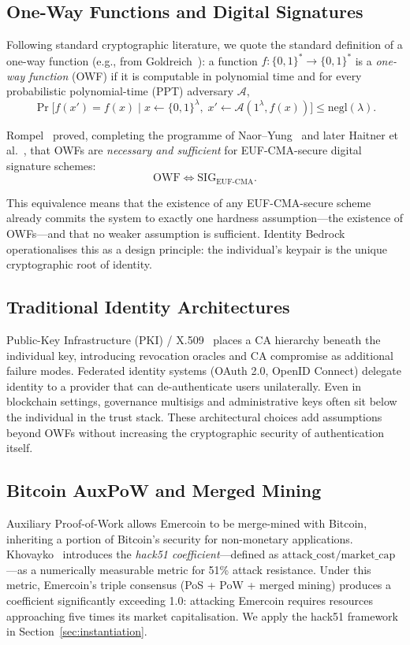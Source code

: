 \documentclass[11pt,a4paper]{article}
\begin{document}
\subsection{One-Way Functions and Digital Signatures}

Following standard cryptographic literature, we quote the standard definition of a one-way function (e.g., from Goldreich~\cite{goldreich2001}): a function $f : \{0,1\}^* \to \{0,1\}^*$ is a \emph{one-way function} (OWF)
if it is computable in polynomial time and for every probabilistic
polynomial-time (PPT) adversary $\mathcal{A}$,
\[
  \Pr\bigl[f(x') = f(x) \;\big|\; x \gets \{0,1\}^\lambda,\;
    x' \gets \mathcal{A}(1^\lambda, f(x))\bigr] \leq \mathrm{negl}(\lambda).
\]

Rompel~\cite{rompel1990} proved, completing the programme of
Naor--Yung~\cite{naoryung1989} and later Haitner et
al.~\cite{haitner2010}, that OWFs are \emph{necessary and sufficient} for
EUF-CMA-secure digital signature schemes:
\[
  \mathrm{OWF} \iff \mathrm{SIG}_{\mathrm{EUF\text{-}CMA}}.
\]

This equivalence means that the existence of any EUF-CMA-secure scheme
already commits the system to exactly one hardness assumption---the existence
of OWFs---and that no weaker assumption is sufficient.  Identity Bedrock
operationalises this as a design principle: the individual's keypair is the
unique cryptographic root of identity.

\subsection{Traditional Identity Architectures}

Public-Key Infrastructure (PKI) / X.509~\cite{rfc5280} places a CA hierarchy
beneath the individual key, introducing revocation oracles and CA compromise
as additional failure modes.  Federated identity systems (OAuth 2.0, OpenID
Connect) delegate identity to a provider that can de-authenticate users
unilaterally.  Even in blockchain settings, governance multisigs and
administrative keys often sit below the individual in the trust stack.  These
architectural choices add assumptions beyond OWFs without increasing the
cryptographic security of authentication itself.

\subsection{Bitcoin AuxPoW and Merged Mining}

Auxiliary Proof-of-Work allows Emercoin to be merge-mined with Bitcoin,
inheriting a portion of Bitcoin's security for non-monetary applications.
Khovayko~\cite{hack51} introduces the \emph{hack51 coefficient}---defined as
$\text{attack\_cost} / \text{market\_cap}$---as a numerically measurable
metric for 51\% attack resistance.  Under this metric, Emercoin's triple
consensus (PoS + PoW + merged mining) produces a coefficient significantly
exceeding 1.0: attacking Emercoin requires resources approaching five times
its market capitalisation.  We apply the hack51 framework in
Section~\ref{sec:instantiation}.
\end{document}
